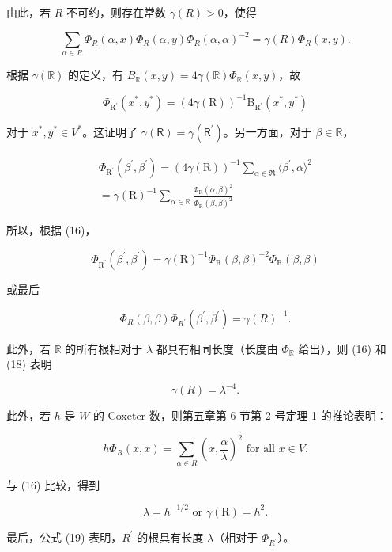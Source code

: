 由此，若 \(R\) 不可约，则存在常数 \(\gamma(R) > 0\)，使得

\[
\sum_ {\alpha \in R} \Phi_ {R} (\alpha , x) \Phi_ {R} (\alpha , y) \Phi_ {R} (\alpha , \alpha) ^ {- 2} = \gamma (R) \Phi_ {R} (x, y).\tag{18}
\]

根据 \(\gamma (\mathbb{R})\) 的定义，有 \(B_{\mathbb{R}}(x,y) = 4\gamma (\mathbb{R})\Phi_{\mathbb{R}}(x,y)\)，故

\[
\Phi_ {\mathrm{R} ^ {\prime}} \left(x ^ {*}, y ^ {*}\right) = (4 \gamma (\mathrm{R})) ^ {- 1} \mathrm{B} _ {\mathrm{R} ^ {\prime}} \left(x ^ {*}, y ^ {*}\right)
\]

对于 \(x^{*},y^{*}\in V^{*}\)。这证明了 \(\gamma (\mathsf{R}) = \gamma (\mathsf{R}^{\prime})\)。另一方面，对于 \(\beta \in \mathbb{R}\)，

\[
\begin{array}{c} \Phi_ {\mathrm{R} ^ {\prime}} (\beta^ {\prime}, \beta^ {\prime}) = (4 \gamma (\mathrm{R})) ^ {- 1} \sum_ {\alpha \in \mathfrak {R}} \langle \beta^ {\prime}, \alpha \rangle^ {2} \\ = \gamma (\mathrm{R}) ^ {- 1} \sum_ {\alpha \in \mathbb {R}} \frac {\Phi_ {\mathrm{R}} (\alpha , \beta) ^ {2}}{\Phi_ {\mathrm{R}} (\beta , \beta) ^ {2}} \end{array}
\]

所以，根据 (16)，

\[
\Phi_ {\mathrm{R} ^ {\prime}} (\beta^ {\prime}, \beta^ {\prime}) = \gamma (\mathrm{R}) ^ {- 1} \Phi_ {\mathrm{R}} (\beta , \beta) ^ {- 2} \Phi_ {\mathrm{R}} (\beta , \beta)
\]

或最后

\[
\Phi_ {R} (\beta , \beta) \Phi_ {R ^ {\prime}} (\beta^ {\prime}, \beta^ {\prime}) = \gamma (R) ^ {- 1}.\tag{19}
\]

此外，若 \(\mathbb{R}\) 的所有根相对于 \(\lambda\) 都具有相同长度（长度由 \(\varPhi_{\mathbb{R}}\) 给出），则 (16) 和 (18) 表明

\[
\gamma (R) = \lambda^ {- 4}.\tag{20}
\]

此外，若 \(h\) 是 \(W\) 的 Coxeter 数，则第五章第 6 节第 2 号定理 1 的推论表明：

\[
h \Phi_ {R} (x, x) = \sum_ {\alpha \in R} \left(x, \frac {\alpha}{\lambda}\right) ^ {2} \text {   for   all   } x \in V.
\]

与 (16) 比较，得到

\[
\lambda = h ^ {- 1 / 2} \text { or } \gamma (\mathrm{R}) = h ^ {2}.\tag{21}
\]

最后，公式 (19) 表明，\(R^{\prime}\) 的根具有长度 \(\lambda\)（相对于 \(\Phi_{R^{\prime}}\)）。

